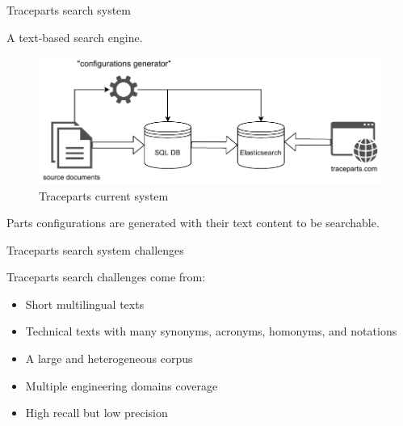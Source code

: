 \begin{frame}{Traceparts search system}
    
    \begin{center}
        A text-based search engine.
    \end{center}
    
    \begin{figure} [H]
        \begin{center}
            \includegraphics[scale=0.7]{images/tp_system.pdf} 
            \caption{Traceparts current system} 
        \end{center}
    \end{figure}

    \begin{center}
        Parts configurations are generated with their text content to be searchable.    
    \end{center}
    
\end{frame}

\begin{frame}{Traceparts search system challenges}
    
    Traceparts search challenges come from:
    \begin{itemize}
        \item Short multilingual texts
        \item Technical texts with many synonyms, acronyms, homonyms, and notations
        \item A large and heterogeneous corpus
        \item Multiple engineering domains coverage
        \item High recall but low precision
    \end{itemize}

\end{frame}